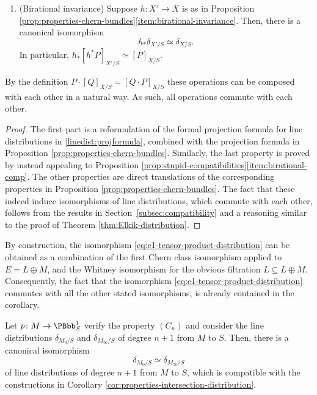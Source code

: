 \begin{corollary}
\begin{enumerate}
\begin{displaymath}
[ \cfrak_r(E) ]_{X/S} \simeq \delta_{Y/S},
\end{displaymath}
where $i\colon Y\hto X$ is the closed immersion of $Y$ in $X$.
\item\label{item:prop-int-dist-birational} (Birational invariance) Suppose $h \colon X' \to X$ is as in Proposition \ref{prop:properties-chern-bundles}\eqref{item:birational-invariance}. Then, there is a canonical isomorphism
\begin{displaymath}
h_\ast \delta_{X'/S}\simeq \delta_{X/S}.
\end{displaymath}
In particular, $h_{\ast}[h^{\ast}P]_{X'/S}\simeq [P]_{X/S}$.
\end{enumerate}
By the definition $P \cdot [Q]_{X/S} = [Q \cdot P]_{X/S}$ these operations can be composed with each other in a natural way. As such, all operations commute with each other.

\end{corollary}

\begin{proof}
The first part is a reformulation of the formal projection formula for line distributions in \eqref{linedist:projformula}, combined with the projection formula in Proposition \ref{prop:properties-chern-bundles}. Similarly, the last property is proved by instead appealing to Proposition \ref{prop:stupid-compatibilities}\eqref{item:birational-comp}. The other properties are direct translations of the corresponding properties in Proposition \ref{prop:properties-chern-bundles}. The fact that these indeed induce isomorphisms of line distributions, which commute with each other, follows from the results in Section~\ref{subsec:compatibility} and a reasoning similar to the proof of Theorem \ref{thm:Elkik-distribution}.
\end{proof}

\begin{remark}
By construction, the isomorphism \eqref{eq:c1-tensor-product-distribution} can be obtained as a combination of the first Chern class isomorphism applied to $E=L\oplus M$, and the Whitney isomorphism for the obvious filtration $L\subseteq L\oplus M$. Consequently, the fact that the isomorphism \eqref{eq:c1-tensor-product-distribution} commutes with all the other stated isomorphisms, is already contained in the corollary.
\end{remark}

\begin{corollary}
Let $p\colon M \to \PBbb^1_S$ verify the property $(C_n)$ and consider the line distributions $\delta_{M_0/S}$ and $\delta_{M_{\infty}/S}$ of degree $n+1$ from $M$ to $S$. Then, there is a canonical isomorphism
\begin{displaymath}
\delta_{M_0/S} \simeq \delta_{M_{\infty}/S}
\end{displaymath}
of line distributions of degree $n+1$ from $M$ to $S$, which is compatible with the constructions in Corollary \ref{cor:properties-intersection-distribution}.
\end{corollary}

